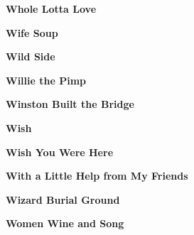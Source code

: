 \vspace{10pt} 
\begin{center}\textbf{Whole Lotta Love}\end{center}
\newline
\vspace{10pt} 
\begin{center}\textbf{Wife Soup}\end{center}
\newline
\vspace{10pt} 
\begin{center}\textbf{Wild Side}\end{center}
\newline
\vspace{10pt} 
\begin{center}\textbf{Willie the Pimp}\end{center}
\newline
\vspace{10pt} 
\begin{center}\textbf{Winston Built the Bridge}\end{center}
\newline
\vspace{10pt} 
\begin{center}\textbf{Wish}\end{center}
\newline
\vspace{10pt} 
\begin{center}\textbf{Wish You Were Here}\end{center}
\newline
\vspace{10pt} 
\begin{center}\textbf{With a Little Help from My Friends}\end{center}
\newline
\vspace{10pt} 
\begin{center}\textbf{Wizard Burial Ground}\end{center}
\newline
\vspace{10pt} 
\begin{center}\textbf{Women Wine and Song}\end{center}
